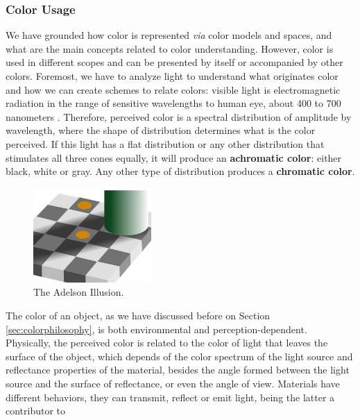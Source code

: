 \subsubsection{Color Usage}
%
We have grounded how color is represented \emph{via} color models and spaces, and what are the main concepts
related to color understanding. However, color is used in different scopes and can be presented by itself or
accompanied by other colors. Foremost, we have to analyze light to understand what originates color and how
we can create schemes to relate colors: visible light is electromagnetic radiation in the range of sensitive
wavelengths to human eye, about 400 to 700 nanometers \cite{Joblove1978}. Therefore,
perceived color is a spectral distribution of amplitude by wavelength, where the shape of distribution determines
what is the color perceived. If this light has a flat distribution or any other distribution that stimulates all
three cones equally, it will produce an \textbf{achromatic color}: either black, white or gray. Any other type of
distribution produces a \textbf{chromatic color}. \par
%
\begin{figure}
	\centering
    \vspace{-\baselineskip}
    \includegraphics[width=0.4\textwidth]{images/background/Adelson_Illusion.jpg}
    \caption[Adelson Illusion]{The Adelson Illusion.\protect\footnotemark{}}
    \label{fig:adelson}
\end{figure}
%
The color of an object, as we have discussed before on Section \ref{sec:colorphilosophy}, is both environmental and
perception-dependent. Physically, the perceived color is related to the color of light that leaves the surface
of the object, which depends of the color spectrum of the light source and reflectance properties of the material,
besides the angle formed between the light source and the surface of reflectance, or even the angle of view.
Materials have different behaviors, they can transmit, reflect or emit light, being the latter a contributor to
